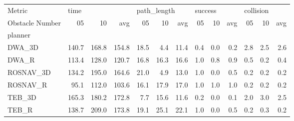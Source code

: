 \begin{tabular}{lrrrrrrrrrrrr}
\toprule
Metric & \multicolumn{3}{l}{time} & \multicolumn{3}{l}{path\_length} & \multicolumn{3}{l}{success} & \multicolumn{3}{l}{collision} \\
Obstacle Number &     05 &     10 &    avg &          05 &    10 &   avg &      05 &   10 &  avg &        05 &   10 &  avg \\
planner   &        &        &        &             &       &       &         &      &      &           &      &      \\
\midrule
DWA\_3D    &  140.7 &  168.8 &  154.8 &        18.5 &   4.4 &  11.4 &     0.4 &  0.0 &  0.2 &       2.8 &  2.5 &  2.6 \\
DWA\_R     &  113.4 &  128.0 &  120.7 &        16.8 &  16.3 &  16.6 &     1.0 &  0.8 &  0.9 &       0.5 &  0.2 &  0.4 \\
ROSNAV\_3D &  134.2 &  195.0 &  164.6 &        21.0 &   4.9 &  13.0 &     1.0 &  0.0 &  0.5 &       0.2 &  0.2 &  0.2 \\
ROSNAV\_R  &   95.1 &  112.0 &  103.6 &        16.1 &  17.9 &  17.0 &     1.0 &  1.0 &  1.0 &       0.2 &  0.2 &  0.2 \\
TEB\_3D    &  165.3 &  180.2 &  172.8 &         7.7 &  15.6 &  11.6 &     0.2 &  0.0 &  0.1 &       2.0 &  3.0 &  2.5 \\
TEB\_R     &  138.7 &  209.0 &  173.8 &        19.1 &  25.1 &  22.1 &     1.0 &  0.0 &  0.5 &       0.2 &  0.3 &  0.2 \\
\bottomrule
\end{tabular}
